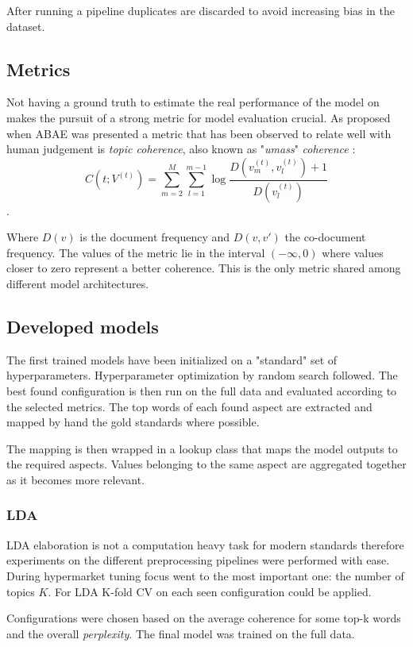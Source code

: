 After running a pipeline duplicates are discarded to avoid increasing bias in the dataset.

\subsection{Metrics}
Not having a ground truth to estimate the real performance of the model on makes the pursuit of a strong metric
for model evaluation crucial.
As proposed when ABAE was presented \cite{he-etal-2017-unsupervised} a metric that has been observed to relate
well with human judgement is \textit{topic coherence}, also known as "\textit{umass}" \textit{coherence} \cite{mimno-etal-2011-optimizing}:
$$C(t;V^{(t)}) = \sum^M_{m=2} \sum^{m-1}_{l=1} \log \frac{D(v_m^{(t)}, v_l^{(t)}) + 1}{D(v_l^{(t)})} $$.

Where $D(v)$ is the document frequency and $D(v,v')$ the co-document frequency.
The values of the metric lie in the interval $(-\infty, 0)$ where values closer to zero represent a better coherence.
This is the only metric shared among different model architectures.

\subsection{Developed models}
The first trained models have been initialized on a "standard" set of hyperparameters.
Hyperparameter optimization by random search followed.
The best found configuration is then run on the full data and evaluated according to the selected metrics.
The top words of each found aspect are extracted and mapped by hand the gold standards where possible.

The mapping is then wrapped in a lookup class that maps the model outputs to the required aspects.
Values belonging to the same aspect are aggregated together as it becomes more relevant.

\subsubsection{LDA}
LDA elaboration is not a computation heavy task for modern standards therefore experiments on the different
preprocessing pipelines were performed with ease.
During hypermarket tuning focus went to the most important one: the number of topics $K$.
For LDA K-fold CV on each seen configuration could be applied.

Configurations were chosen based on the average coherence for some top-k words and the overall \textit{perplexity}.
The final model was trained on the full data.

